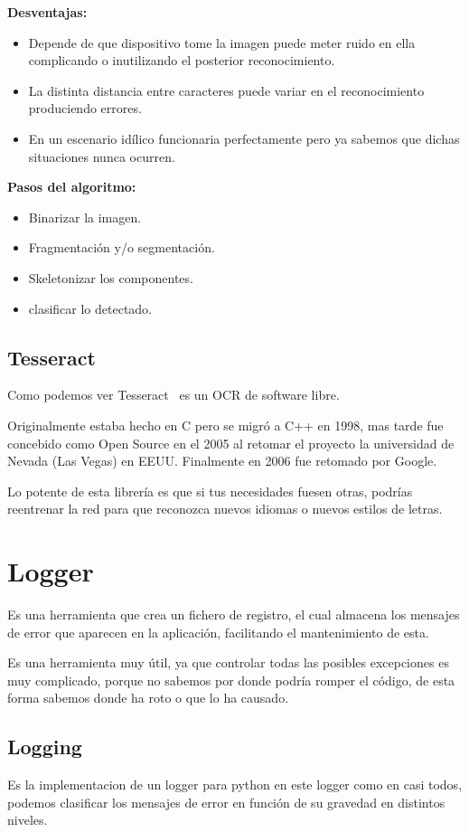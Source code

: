 \textbf{Desventajas:}
\begin{itemize}
\item Depende de que dispositivo tome la imagen puede meter ruido en ella complicando o inutilizando el posterior reconocimiento.
\item La distinta distancia entre caracteres puede variar en el reconocimiento produciendo errores.
\item En un escenario idílico funcionaria perfectamente pero ya sabemos que dichas situaciones nunca ocurren.
\end{itemize}

\textbf{Pasos del algoritmo:}
\begin{itemize}
\item Binarizar la imagen.
\item Fragmentación y/o segmentación.
\item Skeletonizar los componentes.
\item clasificar lo detectado.
\end{itemize}

\subsection{Tesseract}
Como podemos ver Tesseract~\cite{wiki:Tesseract} es un OCR de software libre.

Originalmente estaba hecho en C pero se migró a C++ en 1998, mas tarde fue concebido como Open Source en el 2005 al retomar el proyecto la universidad de Nevada (Las Vegas) en EEUU. Finalmente en 2006 fue retomado por Google.

Lo potente de esta librería es que si tus necesidades fuesen otras, podrías reentrenar la red para que reconozca nuevos idiomas o nuevos estilos de letras.

\section{Logger}
Es una herramienta que crea un fichero de registro, el cual almacena los mensajes de error que aparecen en la aplicación, facilitando el mantenimiento de esta.

Es una herramienta muy útil, ya que controlar todas las posibles excepciones es muy complicado, porque no sabemos por donde podría romper el código, de esta forma sabemos donde ha roto o que lo ha causado.

\subsection{Logging}
Es la implementacion de un logger para python \cite{python:logger} en este logger como en casi todos, podemos clasificar los mensajes de error en función de su gravedad en distintos niveles.

